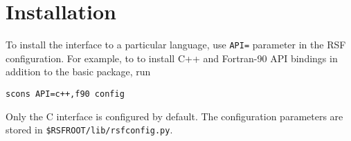 \section{Installation} 

To install the interface to a particular language, use \texttt{API=}
parameter in the RSF configuration. For example, to to install C++ and
Fortran-90 API bindings in addition to the basic package, run
\begin{verbatim}
scons API=c++,f90 config
\end{verbatim}
Only the C interface is configured by default. The configuration
parameters are stored in \texttt{\$RSFROOT/lib/rsfconfig.py}.

 


